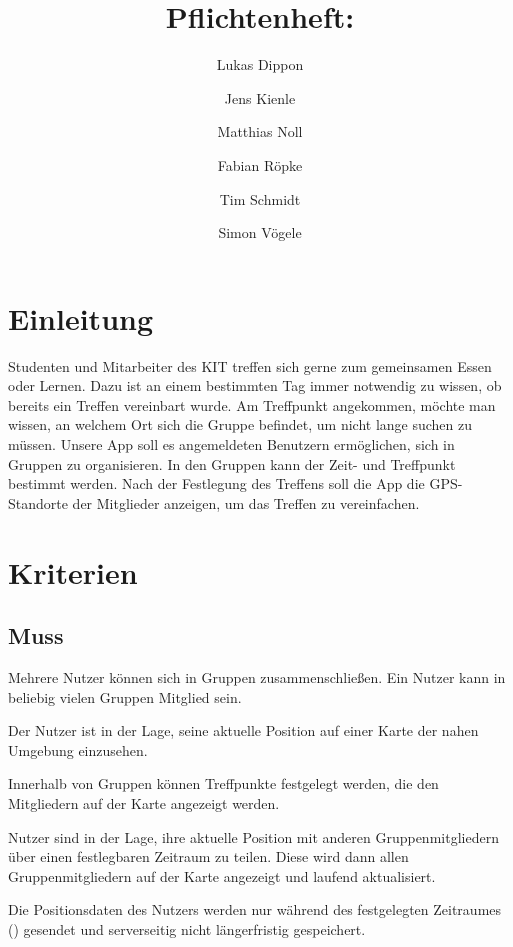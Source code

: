 \documentclass[parskip=full,11pt]{scrartcl}
\title{Pflichtenheft: \producttitle}
\author{Lukas Dippon
        \and Jens Kienle
        \and Matthias Noll
        \and Fabian Röpke
        \and Tim Schmidt
        \and Simon Vögele}
\begin{document}
\maketitle

\section{Einleitung}
Studenten und Mitarbeiter des KIT treffen sich gerne zum gemeinsamen Essen oder Lernen.
Dazu ist an einem bestimmten Tag immer notwendig zu wissen, ob bereits ein Treffen vereinbart wurde.
Am Treffpunkt angekommen, möchte man wissen, an welchem Ort sich die Gruppe befindet, um nicht lange suchen zu müssen.
Unsere App soll es angemeldeten Benutzern ermöglichen, sich in Gruppen zu organisieren.
In den Gruppen kann der Zeit- und Treffpunkt bestimmt werden.
Nach der Festlegung des Treffens soll die App die GPS-Standorte der Mitglieder anzeigen, um das Treffen zu vereinfachen.

\pagebreak
\section{Kriterien}

\subsection{Muss}
Mehrere Nutzer können sich in Gruppen zusammenschließen.
Ein Nutzer kann in beliebig vielen Gruppen Mitglied sein.

Der Nutzer ist in der Lage, seine aktuelle Position auf einer Karte der nahen
Umgebung einzusehen.

Innerhalb von Gruppen können Treffpunkte festgelegt werden,
die den Mitgliedern auf der Karte angezeigt werden.

Nutzer sind in der Lage, ihre aktuelle Position mit anderen Gruppenmitgliedern
über einen festlegbaren Zeitraum zu teilen.
Diese wird dann allen Gruppenmitgliedern auf der Karte angezeigt und laufend
aktualisiert.

Die Positionsdaten des Nutzers werden nur während des festgelegten Zeitraumes
() gesendet und serverseitig nicht
längerfristig gespeichert.
\end{document}
